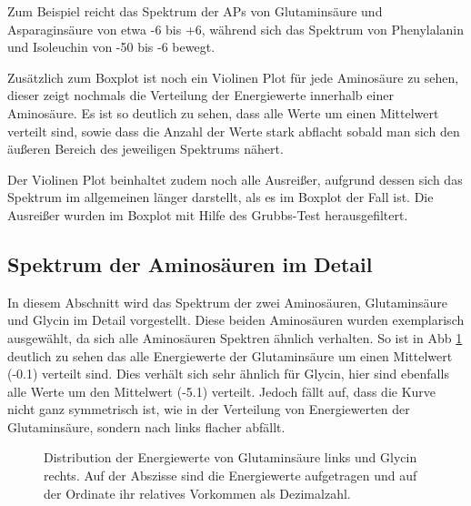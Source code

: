 Zum Beispiel reicht das Spektrum der \ac{APs} von Glutaminsäure und Asparaginsäure von etwa -6 bis +6, während sich das Spektrum von Phenylalanin und Isoleuchin von -50 bis -6 bewegt. 

Zusätzlich zum Boxplot ist noch ein Violinen Plot für jede Aminosäure zu sehen, dieser zeigt nochmals die Verteilung der Energiewerte innerhalb einer Aminosäure. Es ist so deutlich zu sehen, dass alle Werte um einen Mittelwert verteilt sind, sowie dass die Anzahl der Werte stark abflacht sobald man sich den äußeren Bereich des jeweiligen Spektrums nähert.

Der Violinen Plot beinhaltet zudem noch alle Ausreißer, aufgrund dessen sich das Spektrum im allgemeinen länger darstellt, als es im Boxplot der Fall ist. Die Ausreißer wurden im Boxplot mit Hilfe des Grubbs-Test herausgefiltert. 


\newpage
\subsection{Spektrum der Aminosäuren im Detail}

In diesem Abschnitt wird das Spektrum der zwei Aminosäuren, Glutaminsäure und Glycin im Detail vorgestellt. Diese beiden Aminosäuren wurden exemplarisch ausgewählt, da sich alle Aminosäuren Spektren ähnlich verhalten. So ist in \ac{Abb} \ref{fig:ep_as_distr} deutlich zu sehen das alle Energiewerte der Glutaminsäure um einen Mittelwert (-0.1) verteilt sind. Dies verhält sich sehr ähnlich für Glycin, hier sind ebenfalls alle Werte um den Mittelwert (-5.1) verteilt. Jedoch fällt auf, dass die Kurve nicht ganz symmetrisch ist, wie in der Verteilung von Energiewerten der Glutaminsäure, sondern nach links flacher abfällt. 

\begin{figure}
    \caption{Distribution der Energiewerte von Glutaminsäure links und Glycin rechts. Auf der Abszisse sind die Energiewerte aufgetragen und auf der Ordinate ihr relatives Vorkommen als Dezimalzahl.} 
    \label{fig:ep_as_distr}
\end{figure}

